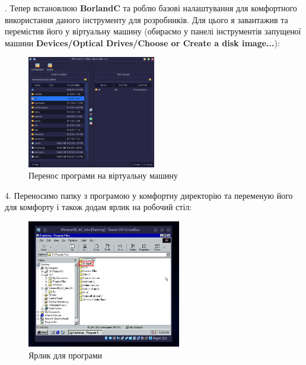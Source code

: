 . Тепер встановлюю \textbf{BorlandC} та роблю базові налаштування для комфортного використання даного інструменту для розробників. Для цього я завантажив та перемістив його у віртуальну машину (обираємо у панелі інструментів запущеної машини \textbf{Devices/Optical Drives/Choose or Create a disk image...}):

\begin{figure}[h]
    \centering
    \includegraphics[width=0.5\textwidth]{reports/AC/lab1/assets/26.jpeg}
    \caption{Перенос програми на віртуальну машину}
\end{figure}

4. Переносимо папку з програмою у комфортну директорію та переменую його для комфорту і також додам ярлик на робочий стіл:

\begin{figure}[h]
    \centering
    \includegraphics[width=0.6\textwidth]{reports/AC/lab1/assets/28.jpeg}
    \caption{Ярлик для програми}
\end{figure}

